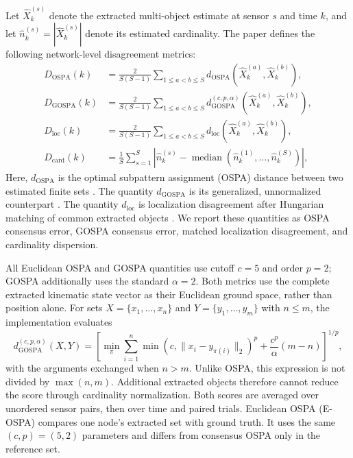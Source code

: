 Let $\hat{X}_k^{(s)}$ denote the extracted multi-object estimate at sensor $s$ and time $k$, and let $\hat{n}_k^{(s)} = |\hat{X}_k^{(s)}|$ denote its estimated cardinality. The paper defines the following network-level disagreement metrics:
\begin{align}
D_{\mathrm{OSPA}}(k)
&=
\frac{2}{S(S-1)}
\sum_{1 \le a < b \le S}
d_{\mathrm{OSPA}}\!\left(\hat{X}_k^{(a)}, \hat{X}_k^{(b)}\right),
\\
D_{\mathrm{GOSPA}}(k)
&=
\frac{2}{S(S-1)}
\sum_{1 \le a < b \le S}
d_{\mathrm{GOSPA}}^{(c,p,\alpha)}\!\left(\hat{X}_k^{(a)}, \hat{X}_k^{(b)}\right),
\\
D_{\mathrm{loc}}(k)
&=
\frac{2}{S(S-1)}
\sum_{1 \le a < b \le S}
d_{\mathrm{loc}}\!\left(\hat{X}_k^{(a)}, \hat{X}_k^{(b)}\right),
\\
D_{\mathrm{card}}(k)
&=
\frac{1}{S}
\sum_{s=1}^{S}
\left|
\hat{n}_k^{(s)}
-
\operatorname{median}\!\left(\hat{n}_k^{(1)},\ldots,\hat{n}_k^{(S)}\right)
\right|,
\end{align}
Here, $d_{\mathrm{OSPA}}$ is the optimal subpattern assignment (OSPA) distance between two estimated finite sets \cite{Schuhmacher2008OSPA}. The quantity $d_{\mathrm{GOSPA}}$ is its generalized, unnormalized counterpart \cite{Rahmathullah2017GOSPA,Ristic2011TrackMetric}. The quantity $d_{\mathrm{loc}}$ is localization disagreement after Hungarian matching of common extracted objects \cite{Kuhn1955Hungarian}. We report these quantities as OSPA consensus error, GOSPA consensus error, matched localization disagreement, and cardinality dispersion.

All Euclidean OSPA and GOSPA quantities use cutoff $c=5$ and order $p=2$; GOSPA additionally uses the standard $\alpha=2$. Both metrics use the complete extracted kinematic state vector as their Euclidean ground space, rather than position alone. For sets $X=\{x_1,\ldots,x_n\}$ and $Y=\{y_1,\ldots,y_m\}$ with $n\leq m$, the implementation evaluates
\begin{equation}
d_{\mathrm{GOSPA}}^{(c,p,\alpha)}(X,Y)
=\left[
\min_{\pi}\sum_{i=1}^{n}\min\!\left(c,\lVert x_i-y_{\pi(i)}\rVert_2\right)^p
+\frac{c^p}{\alpha}(m-n)
\right]^{1/p},
\end{equation}
with the arguments exchanged when $n>m$. Unlike OSPA, this expression is not divided by $\max(n,m)$. Additional extracted objects therefore cannot reduce the score through cardinality normalization. Both scores are averaged over unordered sensor pairs, then over time and paired trials. Euclidean OSPA (E-OSPA) compares one node's extracted set with ground truth. It uses the same $(c,p)=(5,2)$ parameters and differs from consensus OSPA only in the reference set.


